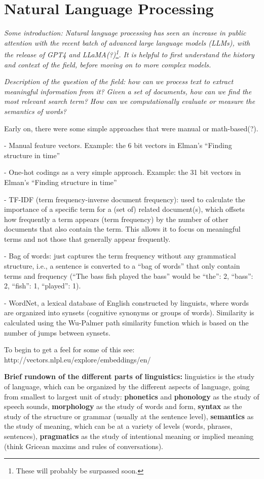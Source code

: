 \chapter{Natural Language Processing}\label{ch_nlp}

\textit{Some introduction: Natural language processing has seen an increase in public attention with the recent batch of advanced large language models (LLMs), with the release of GPT4 and LLaMA(?)\footnote{These will probably be surpassed soon.}. It is helpful to first understand the history and context of the field, before moving on to more complex models.}


\textit{Description of the question of the field: how can we process text to extract meaningful information from it? Given a set of documents, how can we find the most relevant search term? How can we computationally evaluate or measure the semantics of words?}

Early on, there were some simple approaches that were manual or math-based(?).

- Manual feature vectors.  Example: the 6 bit vectors in Elman's ``Finding structure in time''

- One-hot codings as a very simple approach. Example: the 31 bit vectors  in Elman's ``Finding structure in time''

- TF-IDF (term frequency-inverse document frequency): used to calculate the importance of a specific term for a (set of) related document(s), which offsets how frequently a term appears (term frequency) by the number of other documents that also contain the term. This allows it to focus on meaningful terms and not those that generally appear frequently. 

- Bag of words: just captures the term frequency without any grammatical structure, i.e., a sentence is converted to a ``bag of words'' that only contain terms and frequency (``The bass fish played the bass'' would be {``the'': 2, ``bass'': 2, ``fish'': 1, ``played'': 1}).

- WordNet, a lexical database of English constructed by linguists, where words are organized into synsets (cognitive synonyms or groups of words). Similarity is calculated using the Wu-Palmer path similarity function which is based on the number of jumps between synsets.

To begin to get a feel for some of this see: http://vectors.nlpl.eu/explore/embeddings/en/

\textbf{Brief rundown of the different parts of linguistics:} linguistics is the study of language, which can be organized by the different aspects of language, going from smallest to largest unit of study: \textbf{phonetics} and \textbf{phonology} as the study of speech sounds, \textbf{morphology} as the study of words and form, \textbf{syntax} as the study of the structure or grammar (usually at the sentence level), \textbf{semantics} as the study of meaning, which can be at a variety of levels (words, phrases, sentences), \textbf{pragmatics} as the study of intentional meaning or implied meaning (think Gricean maxims and rules of conversations). 

